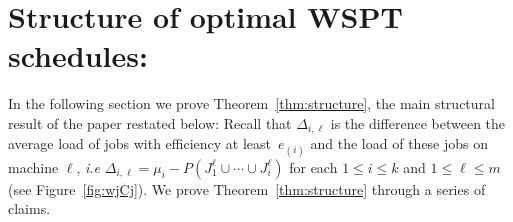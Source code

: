 \documentclass[11pt]{llncs}
\begin{document}










\section{Structure of optimal WSPT schedules:}

In the following section we prove Theorem~\ref{thm:structure}, the main structural result of the paper restated below: 
\structure*
\noindent Recall that $\Delta_{i,\ell}$ is the difference between the average load of jobs with efficiency at least~$e_{(i)}$ and the load of these jobs on machine $\ell$, \emph{i.e} $\Delta_{i,\ell}=\mu_i -P(J^\ell_1 \cup \cdots \cup J^\ell_i)$ for each $1 \leq i \leq k$ and $1 \leq \ell \leq m$ (see Figure~\ref{fig:wjCj}). We prove Theorem~\ref{thm:structure} through a series of claims. 

\end{document}
